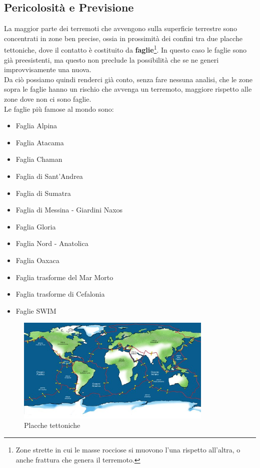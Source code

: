 \subsection{Pericolosit\`a e Previsione}\label{previsione}

La maggior parte dei terremoti che avvengono sulla superficie terrestre sono concentrati in zone ben precise, ossia in prossimit\`a dei confini tra due placche tettoniche, dove il contatto \`e costituito da \textbf{faglie}\footnote{Zone strette in cui le masse rocciose si muovono l'una rispetto all'altra, o anche frattura che genera il terremoto.}. In questo caso le faglie sono gi\`a preesistenti, ma questo non preclude la possibilit\`a che se ne generi improvvisamente una nuova.\\
Da ci\`o possiamo quindi renderci gi\`a conto, senza fare nessuna analisi, che le zone sopra le faglie hanno un rischio che avvenga un terremoto, maggiore rispetto alle zone dove non ci sono faglie. \cite{earthquake}\\
Le faglie pi\`u famose al mondo sono:
\begin{itemize}
    \item Faglia Alpina
    \item Faglia Atacama
    \item Faglia Chaman
    \item Faglia di Sant'Andrea
    \item Faglia di Sumatra
    \item Faglia di Messina - Giardini Naxos
    \item Faglia Gloria
    \item Faglia Nord - Anatolica
    \item Faglia Oaxaca
    \item Faglia trasforme del Mar Morto
    \item Faglia trasforme di Cefalonia
    \item Faglie SWIM
\end{itemize}
\begin{figure}[H]
   \centering
   \includegraphics[width=0.835\textwidth]{images/placcheTettoniche.jpg}
   \caption{Placche tettoniche}
\end{figure}
